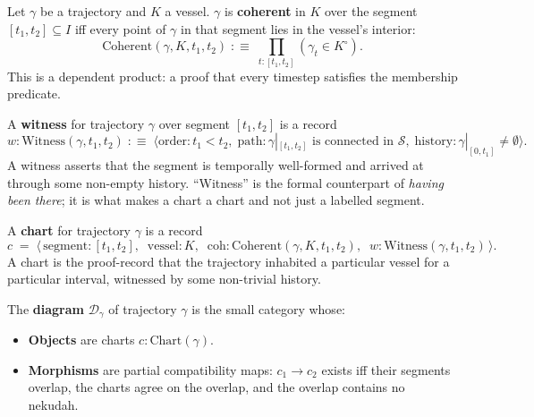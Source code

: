 \begin{definition}\label{coherent}
Let $\gamma$ be a trajectory and $K$ a vessel. $\gamma$ is \textbf{coherent} in $K$ over the segment $[t_1, t_2] \subseteq I$ iff every point of $\gamma$ in that segment lies in the vessel's interior:
\[
\mathrm{Coherent}(\gamma, K, t_1, t_2) \;:\equiv\; \prod_{t : [t_1, t_2]} (\gamma_t \in K^{\circ}).
\]
This is a dependent product: a proof that every timestep satisfies the membership predicate.
\end{definition}

\begin{definition}[Witness]\label{witness}
A \textbf{witness} for trajectory $\gamma$ over segment $[t_1, t_2]$ is a record
\[
w : \mathrm{Witness}(\gamma, t_1, t_2) \;:\equiv\; \big\langle \mathrm{order} : t_1 < t_2,\; \mathrm{path} : \gamma|_{[t_1, t_2]} \text{ is connected in } \mathcal{S},\; \mathrm{history} : \gamma|_{[0, t_1]} \neq \emptyset \big\rangle.
\]
A witness asserts that the segment is temporally well-formed and arrived at through some non-empty history. ``Witness'' is the formal counterpart of \emph{having been there}; it is what makes a chart a chart and not just a labelled segment.
\end{definition}

\begin{definition}[Chart]\label{chart}
A \textbf{chart} for trajectory $\gamma$ is a record
\[
c \;=\; \big\langle\, \mathrm{segment} : [t_1, t_2],\;\; \mathrm{vessel} : K,\;\; \mathrm{coh} : \mathrm{Coherent}(\gamma, K, t_1, t_2),\;\; w : \mathrm{Witness}(\gamma, t_1, t_2) \,\big\rangle.
\]
A chart is the proof-record that the trajectory inhabited a particular vessel for a particular interval, witnessed by some non-trivial history.
\end{definition}

\begin{definition}[Diagram]\label{diagram}
The \textbf{diagram} $\mathcal{D}_\gamma$ of trajectory $\gamma$ is the small category whose:
\begin{itemize}
    \item \textbf{Objects} are charts $c : \mathrm{Chart}(\gamma)$.
    \item \textbf{Morphisms} are partial compatibility maps: $c_1 \to c_2$ exists iff their segments overlap, the charts agree on the overlap, and the overlap contains no nekudah.
\end{itemize}
\end{definition}

